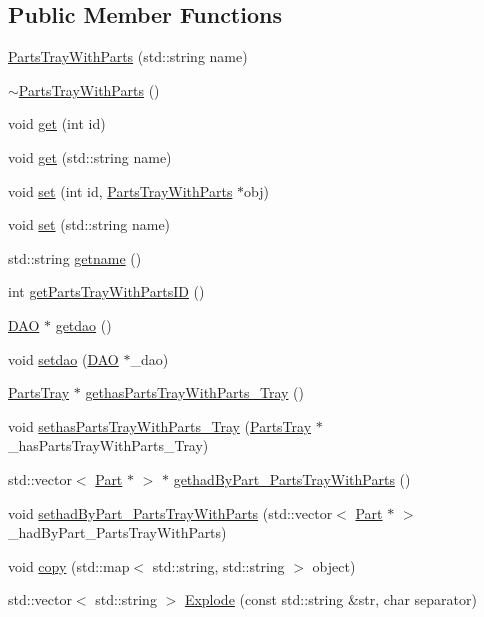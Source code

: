 \subsection*{Public Member Functions}
\begin{DoxyCompactItemize}
\item 
\hyperlink{class_parts_tray_with_parts_a517bdba63b32e9466dc6de69bdae9b6b}{PartsTrayWithParts} (std::string name)
\item 
\hyperlink{class_parts_tray_with_parts_af9c6ce493fe860616d8a472b50c7b6e1}{$\sim$PartsTrayWithParts} ()
\item 
void \hyperlink{class_parts_tray_with_parts_ae28bbb62da89a3e47b8e0345fa33d2c3}{get} (int id)
\item 
void \hyperlink{class_parts_tray_with_parts_a6fe375e6b1f71fd27becc9ad1cfd5983}{get} (std::string name)
\item 
void \hyperlink{class_parts_tray_with_parts_adfaa5299a1c8de8189d12d51ca51cadd}{set} (int id, \hyperlink{class_parts_tray_with_parts}{PartsTrayWithParts} $\ast$obj)
\item 
void \hyperlink{class_parts_tray_with_parts_aadf7957f064798c9abeafbe32cdf0c22}{set} (std::string name)
\item 
std::string \hyperlink{class_parts_tray_with_parts_a3c0d0799ad4428108a37133f658c76d7}{getname} ()
\item 
int \hyperlink{class_parts_tray_with_parts_abe63b4664f98862b43a6ee4aa0eca157}{getPartsTrayWithPartsID} ()
\item 
\hyperlink{class_d_a_o}{DAO} $\ast$ \hyperlink{class_parts_tray_with_parts_a2e53d3713b075b26dad886102956d10d}{getdao} ()
\item 
void \hyperlink{class_parts_tray_with_parts_a3cff21f3e6e916c2d7c5a136734b3ef1}{setdao} (\hyperlink{class_d_a_o}{DAO} $\ast$\_\-dao)
\item 
\hyperlink{class_parts_tray}{PartsTray} $\ast$ \hyperlink{class_parts_tray_with_parts_a36d7aaf0cb3550bc895462a5b56ce5b0}{gethasPartsTrayWithParts\_\-Tray} ()
\item 
void \hyperlink{class_parts_tray_with_parts_aacaebeac568ddd3f6e6df151e5237e9c}{sethasPartsTrayWithParts\_\-Tray} (\hyperlink{class_parts_tray}{PartsTray} $\ast$\_\-hasPartsTrayWithParts\_\-Tray)
\item 
std::vector$<$ \hyperlink{class_part}{Part} $\ast$ $>$ $\ast$ \hyperlink{class_parts_tray_with_parts_a6002d936f69dee3105827cac73bdd66e}{gethadByPart\_\-PartsTrayWithParts} ()
\item 
void \hyperlink{class_parts_tray_with_parts_a4c7bdb3b8fdca36fb26fb5970e696068}{sethadByPart\_\-PartsTrayWithParts} (std::vector$<$ \hyperlink{class_part}{Part} $\ast$ $>$ \_\-hadByPart\_\-PartsTrayWithParts)
\item 
void \hyperlink{class_parts_tray_with_parts_ac79b4dc47be8add4b40639cff36823ff}{copy} (std::map$<$ std::string, std::string $>$ object)
\item 
std::vector$<$ std::string $>$ \hyperlink{class_parts_tray_with_parts_a2f029e4d41a8a26e95bed0a3f51e6f2f}{Explode} (const std::string \&str, char separator)
\end{DoxyCompactItemize}


